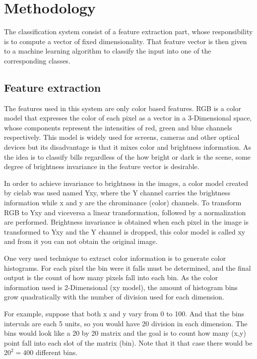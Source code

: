 \documentclass{IEEEtran}
\begin{document}
\section{Methodology}

The classification system consist of a feature extraction part, whose responsibility is to compute a vector of
fixed dimensionality. That feature vector is then given to a machine learning algorithm to classify the input
into one of the corresponding classes.

\subsection{Feature extraction}

The features used in this system are only color based features. RGB is a color model that expresses the color of
each pixel as a vector in a 3-Dimensional space, whose components represent the intensities of red, green and blue
channels respectively. This model is widely used for screens, cameras and other optical devices but its disadvantage is 
that it mixes color and brightness information. As the idea is to classify bills regardless of the how bright or 
dark is the scene, some degree of brightness invariance in the feature vector is desirable.

In order to achieve invariance to brightness in the images, a color model created by cielab was used %
named Yxy, where the Y channel carries the brightness information while x and y are the chrominance (color) 
channels. To transform RGB to Yxy and viceversa a linear transformation, followed by a normalization are
performed. Brightness invariance is obtained when each pixel in the image is transformed to Yxy and the
Y channel is dropped, this color model is called xy and from it you can not obtain the original image.

One very used technique to extract color information is to generate color histograms. For each pixel
the bin were it falls must be determined, and the final output is the count of how many pixels fall
into each bin. As the color information used is 2-Dimensional (xy model), the amount of histogram
bins grow quadratically with the number of division used for each dimension. 

For example, suppose that both x and y vary from 0 to 100. And that the bins intervals are each 5
units, so you would have 20 division in each dimension. The bins would look like a 20 by 20 matrix
and the goal is to count how many (x,y) point fall into each slot of the matrix (bin). Note that
it that case there would be $20^2=400$ different bins.
\end{document}
